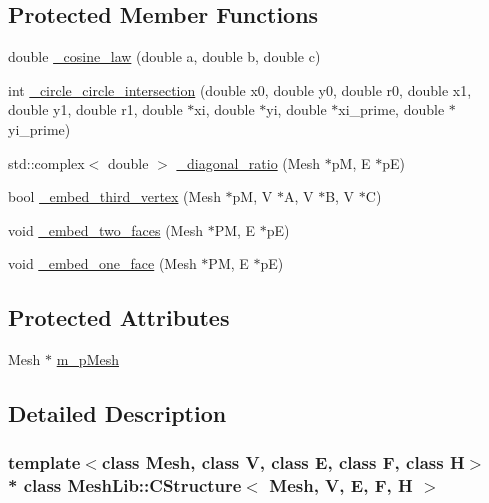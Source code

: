 \subsection*{Protected Member Functions}
\begin{DoxyCompactItemize}
\item 
double \hyperlink{class_mesh_lib_1_1_c_structure_a3cf9efb8667b631cdea313524d1f2517}{\+\_\+cosine\+\_\+law} (double a, double b, double c)
\item 
int \hyperlink{class_mesh_lib_1_1_c_structure_a7b6c7c5319e26dc4e418554e379fc973}{\+\_\+circle\+\_\+circle\+\_\+intersection} (double x0, double y0, double r0, double x1, double y1, double r1, double $\ast$xi, double $\ast$yi, double $\ast$xi\+\_\+prime, double $\ast$yi\+\_\+prime)
\item 
std\+::complex$<$ double $>$ \hyperlink{class_mesh_lib_1_1_c_structure_a0863a582fe471af9e19682e558c801be}{\+\_\+diagonal\+\_\+ratio} (Mesh $\ast$pM, E $\ast$pE)
\item 
bool \hyperlink{class_mesh_lib_1_1_c_structure_a04089c436e17ece0a1caba3aa167a111}{\+\_\+embed\+\_\+third\+\_\+vertex} (Mesh $\ast$pM, V $\ast$A, V $\ast$B, V $\ast$C)
\item 
void \hyperlink{class_mesh_lib_1_1_c_structure_a04bb3255b61df168864a13d952fbf65d}{\+\_\+embed\+\_\+two\+\_\+faces} (Mesh $\ast$PM, E $\ast$pE)
\item 
void \hyperlink{class_mesh_lib_1_1_c_structure_a2852dfc5fbd04e032b0a1542db48dad2}{\+\_\+embed\+\_\+one\+\_\+face} (Mesh $\ast$PM, E $\ast$pE)
\end{DoxyCompactItemize}
\subsection*{Protected Attributes}
\begin{DoxyCompactItemize}
\item 
Mesh $\ast$ \hyperlink{class_mesh_lib_1_1_c_structure_a9241359e43cc23ef2a70c9ada3bc73a7}{m\+\_\+p\+Mesh}
\end{DoxyCompactItemize}


\subsection{Detailed Description}
\subsubsection*{template$<$class Mesh, class V, class E, class F, class H$>$\\*
class Mesh\+Lib\+::\+C\+Structure$<$ Mesh, V, E, F, H $>$}

